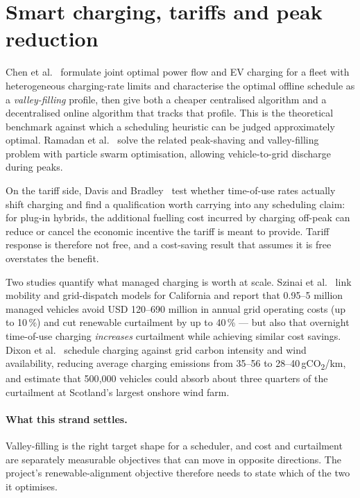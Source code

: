 \documentclass[11pt,a4paper]{article}
\begin{document}
\section{Smart charging, tariffs and peak reduction}\label{sec:scheduling}

Chen et al.~\cite{Chen2012ValleyFilling} formulate joint optimal power flow and EV charging for a
fleet with heterogeneous charging-rate limits and characterise the optimal offline schedule as a
\emph{valley-filling} profile, then give both a cheaper centralised algorithm and a decentralised
online algorithm that tracks that profile. This is the theoretical benchmark against which a
scheduling heuristic can be judged approximately optimal. Ramadan et
al.~\cite{Ramadan2018PeakShavingValleyFilling} solve the related peak-shaving and valley-filling problem
with particle swarm optimisation, allowing vehicle-to-grid discharge during peaks.

On the tariff side, Davis and Bradley~\cite{Davis2012TOURatesEfficacy} test whether time-of-use rates
actually shift charging and find a qualification worth carrying into any scheduling claim: for
plug-in hybrids, the additional fuelling cost incurred by charging off-peak can reduce or cancel the
economic incentive the tariff is meant to provide. Tariff response is therefore not free, and a
cost-saving result that assumes it is free overstates the benefit.

Two studies quantify what managed charging is worth at scale. Szinai et
al.~\cite{Szinai2020ReducedGridOperatingCosts} link mobility and grid-dispatch models for California
and report that 0.95--5 million managed vehicles avoid USD 120--690 million in annual grid
operating costs (up to 10\,\%) and cut renewable curtailment by up to 40\,\% --- but also that
overnight time-of-use charging \emph{increases} curtailment while achieving similar cost savings.
Dixon et al.~\cite{Dixon2020MinimiseEmissionsWindCurtailment} schedule charging against grid carbon
intensity and wind availability, reducing average charging emissions from 35--56 to
28--40\,gCO\textsubscript{2}/km, and estimate that 500{,}000 vehicles could absorb about three
quarters of the curtailment at Scotland's largest onshore wind farm.

\paragraph{What this strand settles.} Valley-filling is the right target shape for a scheduler, and
cost and curtailment are separately measurable objectives that can move in opposite directions. The
project's renewable-alignment objective therefore needs to state which of the two it optimises.
\end{document}
